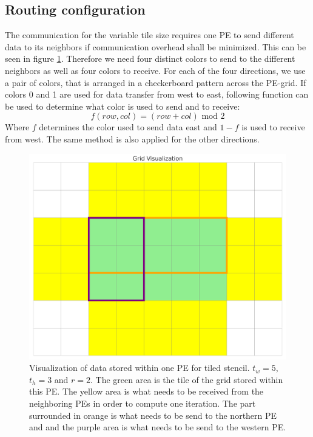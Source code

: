 \documentclass{article}
\newcommand{\m}{\text{ mod }}
\begin{document}
\subsection{Routing configuration}
The communication for the variable tile size requires one PE to send different data to its neighbors if communication overhead shall be minimized. This can be seen in figure \ref{fig:grid_visualization}. Therefore we need four distinct colors to send to the different neighbors as well as four colors to receive. For each of the four directions, we use a pair of colors, that is arranged in a checkerboard pattern across the PE-grid.
If colors 0 and 1 are used for data transfer from west to east, following function can be used to determine what color is used to send and to receive:
$$f(row, col)=(row+col)\m2$$
Where $f$ determines the color used to send data east and $1-f$ is used to receive from west. The same method is also applied for the other directions.
\begin{figure}
    \centering
    \includegraphics[width=0.5\linewidth]{grid_visualization.png}
    \caption{Visualization of data stored within one PE for tiled stencil. $t_w=5$, $t_h=3$ and $r=2$. The green area is the tile of the grid stored within this PE. The yellow area is what needs to be received from the neighboring PEs in order to compute one iteration. The part surrounded in orange is what needs to be send to the northern PE and and the purple area is what needs to be send to the western PE.}
    \label{fig:grid_visualization}
\end{figure}
\end{document}
